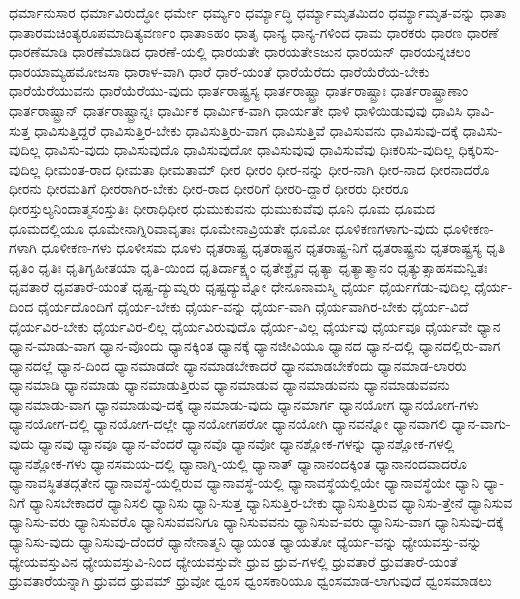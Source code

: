 {ಧರ್ಮಾನುಸಾರ
ಧರ್ಮಾವಿರುದ್ಧೋ
ಧರ್ಮೇ
ಧರ್ಮ್ಯಂ
ಧರ್ಮ್ಯಾದ್ಧಿ
ಧರ್ಮ್ಯಾಮೃತಮಿದಂ
ಧರ್ಮ್ಯಾಮೃತ-ವನ್ನು
ಧಾತಾ
ಧಾತಾರಮಚಿಂತ್ಯರೂಪಮಾದಿತ್ಯವರ್ಣಂ
ಧಾತಾಽಹಂ
ಧಾತೃ
ಧಾನ್ಯ
ಧಾನ್ಯ-ಗಳಿಂದ
ಧಾಮ
ಧಾರಕರು
ಧಾರಣ
ಧಾರಣೆ
ಧಾರಣೆಮಾಡಿ
ಧಾರಣೆಮಾಡಿದ
ಧಾರಣೆ-ಯಲ್ಲಿ
ಧಾರಯತೇ
ಧಾರಯತೇಽಜುನ
ಧಾರಯನ್
ಧಾರಯನ್ನಚಲಂ
ಧಾರಯಾಮ್ಯಹಮೋಜಸಾ
ಧಾರಾಳ-ವಾಗಿ
ಧಾರೆ
ಧಾರೆ-ಯಂತೆ
ಧಾರೆಯೆರೆದು
ಧಾರೆಯೆರೆಯ-ಬೇಕು
ಧಾರೆಯೆರೆಯುವನು
ಧಾರೆಯೆರೆಯು-ವುದು
ಧಾರ್ತರಾಷ್ಟ್ರಸ್ಯ
ಧಾರ್ತರಾಷ್ಟ್ರಾ
ಧಾರ್ತರಾಷ್ಟ್ರಾಃ
ಧಾರ್ತರಾಷ್ಟ್ರಾಣಾಂ
ಧಾರ್ತರಾಷ್ಟ್ರಾನ್
ಧಾರ್ತರಾಷ್ಟ್ರಾನ್ನಃ
ಧಾರ್ಮಿಕ
ಧಾರ್ಮಿಕ-ವಾಗಿ
ಧಾರ್ಯತೇ
ಧಾಳಿ
ಧಾಳಿಯಿಡುವುವು
ಧಾವಿಸಿ
ಧಾವಿ-ಸುತ್ತ
ಧಾವಿಸುತ್ತಿದ್ದರೆ
ಧಾವಿಸುತ್ತಿರ-ಬೇಕು
ಧಾವಿಸುತ್ತಿರು-ವಾಗ
ಧಾವಿಸುತ್ತಿವೆ
ಧಾವಿಸುವನು
ಧಾವಿಸುವು-ದಕ್ಕೆ
ಧಾವಿಸು-ವುದಿಲ್ಲ
ಧಾವಿಸು-ವುದು
ಧಾವಿಸುವುದೊ
ಧಾವಿಸುವುದೋ
ಧಾವಿಸುವುವು
ಧಾವಿಸುವೆವು
ಧಿಃಕರಿಸು-ವುದಿಲ್ಲ
ಧಿಕ್ಕರಿಸು-ವುದಿಲ್ಲ
ಧೀಮಂತ-ರಾದ
ಧೀಮತಾ
ಧೀಮತಾಮ್
ಧೀರ
ಧೀರಂ
ಧೀರ-ನನ್ನು
ಧೀರ-ನಾಗಿ
ಧೀರ-ನಾದ
ಧೀರನಾದರೊ
ಧೀರನು
ಧೀರಮತಿಗೆ
ಧೀರರಾಗಿರ-ಬೇಕು
ಧೀರ-ರಾದ
ಧೀರರಿಗೆ
ಧೀರರಿ-ದ್ದಾರೆ
ಧೀರರು
ಧೀರರೂ
ಧೀರಸ್ತುಲ್ಯನಿಂದಾತ್ಮಸಂಸ್ತುತಿಃ
ಧೀರಾಧಿಧೀರ
ಧುಮುಕುವನು
ಧುಮುಕುವೆವು
ಧೂನಿ
ಧೂಮ
ಧೂಮದ
ಧೂಮದಲ್ಲಿಯೂ
ಧೂಮೇನಾಗ್ನಿರಿವಾವೃತಾಃ
ಧೂಮೇನಾವ್ರಿಯತೇ
ಧೂಮೋ
ಧೂಳಿಕಣಗಳಾಗು-ವುದು
ಧೂಳೀಕಣ-ಗಳಾಗಿ
ಧೂಳೀಕಣ-ಗಳು
ಧೂಳೀಸಮ
ಧೂಳು
ಧೃತರಾಷ್ಟ್ರ
ಧೃತರಾಷ್ಟ್ರನ
ಧೃತರಾಷ್ಟ್ರ-ನಿಗೆ
ಧೃತರಾಷ್ಟ್ರನು
ಧೃತರಾಷ್ಟ್ರಸ್ಯ
ಧೃತಿ
ಧೃತಿಂ
ಧೃತಿಃ
ಧೃತಿಗೃಹೀತಯಾ
ಧೃತಿ-ಯಿಂದ
ಧೃತಿರ್ದಾಕ್ಷ್ಯಂ
ಧೃತೇಶ್ಚೈವ
ಧೃತ್ಯಾ
ಧೃತ್ಯಾತ್ಮಾನಂ
ಧೃತ್ಯುತ್ಸಾಹಸಮನ್ವಿತಃ
ಧೃವತಾರೆ
ಧೃವತಾರೆ-ಯಂತೆ
ಧೃಷ್ಟ-ದ್ಯುಮ್ನರು
ಧೃಷ್ಟದ್ಯುಮ್ನೋ
ಧೇನೂನಾಮಸ್ಮಿ
ಧೈರ್ಯ
ಧೈರ್ಯಗೆಡು-ವುದಿಲ್ಲ
ಧೈರ್ಯ-ದಿಂದ
ಧೈರ್ಯದೊಂದಿಗೆ
ಧೈರ್ಯ-ಬೇಕು
ಧೈರ್ಯ-ವನ್ನು
ಧೈರ್ಯ-ವಾಗಿ
ಧೈರ್ಯವಾಗಿರ-ಬೇಕು
ಧೈರ್ಯ-ವಿದೆ
ಧೈರ್ಯವಿರ-ಬೇಕು
ಧೈರ್ಯವಿರ-ಲಿಲ್ಲ
ಧೈರ್ಯವಿರುವುದೊ
ಧೈರ್ಯ-ವಿಲ್ಲ
ಧೈರ್ಯವು
ಧೈರ್ಯವೂ
ಧೈರ್ಯವೇ
ಧ್ಯಾನ
ಧ್ಯಾನ-ಮಾಡು-ವಾಗ
ಧ್ಯಾನ-ವೊಂದು
ಧ್ಯಾನಕ್ಕಿಂತ
ಧ್ಯಾನಕ್ಕೆ
ಧ್ಯಾನಜೀವಿಯೂ
ಧ್ಯಾನದ
ಧ್ಯಾನ-ದಲ್ಲಿ
ಧ್ಯಾನದಲ್ಲಿರು-ವಾಗ
ಧ್ಯಾನದಲ್ಲೆ
ಧ್ಯಾನ-ದಿಂದ
ಧ್ಯಾನಮಾಡದೇ
ಧ್ಯಾನಮಾಡಬೇಕಾದರೆ
ಧ್ಯಾನಮಾಡಬೇಕೆಂದು
ಧ್ಯಾನಮಾಡ-ಲಾರರು
ಧ್ಯಾನಮಾಡಿ
ಧ್ಯಾನಮಾಡು
ಧ್ಯಾನಮಾಡುತ್ತಿರುವ
ಧ್ಯಾನಮಾಡುವ
ಧ್ಯಾನಮಾಡುವನು
ಧ್ಯಾನಮಾಡುವವನು
ಧ್ಯಾನಮಾಡು-ವಾಗ
ಧ್ಯಾನಮಾಡುವು-ದಕ್ಕೆ
ಧ್ಯಾನಮಾಡು-ವುದು
ಧ್ಯಾನಮಾರ್ಗ
ಧ್ಯಾನಯೋಗ
ಧ್ಯಾನಯೋಗ-ಗಳು
ಧ್ಯಾನಯೋಗ-ದಲ್ಲಿ
ಧ್ಯಾನಯೋಗ-ದಲ್ಲೇ
ಧ್ಯಾನಯೋಗಪರೋ
ಧ್ಯಾನಯೋಗಿ
ಧ್ಯಾನವನ್ನೋ
ಧ್ಯಾನವಾಗಲಿ
ಧ್ಯಾನ-ವಾಗು-ವುದು
ಧ್ಯಾನವು
ಧ್ಯಾನವೂ
ಧ್ಯಾನ-ವೆಂದರೆ
ಧ್ಯಾನವೊ
ಧ್ಯಾನವೋ
ಧ್ಯಾನಶ್ಲೋಕ-ಗಳನ್ನು
ಧ್ಯಾನಶ್ಲೋಕ-ಗಳಲ್ಲಿ
ಧ್ಯಾನಶ್ಲೋಕ-ಗಳು
ಧ್ಯಾನಸಮಯ-ದಲ್ಲಿ
ಧ್ಯಾನಾಗ್ನಿ-ಯಲ್ಲಿ
ಧ್ಯಾನಾತ್
ಧ್ಯಾನಾನಂದಕ್ಕಿಂತ
ಧ್ಯಾನಾನಂದವಾದರೊ
ಧ್ಯಾನಾವಸ್ಥಿತತದ್ಗತೇನ
ಧ್ಯಾನಾವಸ್ಥೆ-ಯಲ್ಲಿರುವ
ಧ್ಯಾನಾವಸ್ಥೆ-ಯಲ್ಲಿ
ಧ್ಯಾನಾವಸ್ಥೆಯಲ್ಲಿಯೇ
ಧ್ಯಾನಾವಸ್ಥೆಯೇ
ಧ್ಯಾನಿ
ಧ್ಯಾ-ನಿಗೆ
ಧ್ಯಾನಿಸಬೇಕಾದರೆ
ಧ್ಯಾನಿಸಲಿ
ಧ್ಯಾನಿಸು
ಧ್ಯಾನಿ-ಸುತ್ತ
ಧ್ಯಾನಿಸುತ್ತಿರ-ಬೇಕು
ಧ್ಯಾನಿಸುತ್ತಿರುವ
ಧ್ಯಾನಿಸು-ತ್ತೇನೆ
ಧ್ಯಾನಿಸುವ
ಧ್ಯಾನಿಸು-ವರು
ಧ್ಯಾನಿಸುವರೊ
ಧ್ಯಾನಿಸುವವನಿಗೂ
ಧ್ಯಾನಿಸುವವನು
ಧ್ಯಾನಿಸುವ-ವರು
ಧ್ಯಾನಿಸು-ವಾಗ
ಧ್ಯಾನಿಸುವು-ದಕ್ಕೆ
ಧ್ಯಾನಿಸು-ವುದು
ಧ್ಯಾನಿಸುವು-ದೆಂದರೆ
ಧ್ಯಾನೇನಾತ್ಮನಿ
ಧ್ಯಾಯಂತ
ಧ್ಯಾಯತೋ
ಧ್ಯೆರ್ಯ-ವನ್ನು
ಧ್ಯೇಯವಸ್ತು-ವನ್ನು
ಧ್ಯೇಯವಸ್ತುವಿನ
ಧ್ಯೇಯವಸ್ತುವಿ-ನಿಂದ
ಧ್ಯೇಯವಸ್ತುವೇ
ಧ್ರುವ
ಧ್ರುವ-ಗಳಲ್ಲಿ
ಧ್ರುವತಾರೆ
ಧ್ರುವತಾರೆ-ಯಂತೆ
ಧ್ರುವತಾರೆಯನ್ನಾಗಿ
ಧ್ರುವದ
ಧ್ರುವಮ್
ಧ್ರುವೋ
ಧ್ವಂಸ
ಧ್ವಂಸಕಾರಿಯೂ
ಧ್ವಂಸಮಾಡ-ಲಾಗುವುದೆ
ಧ್ವಂಸಮಾಡಲು
}
